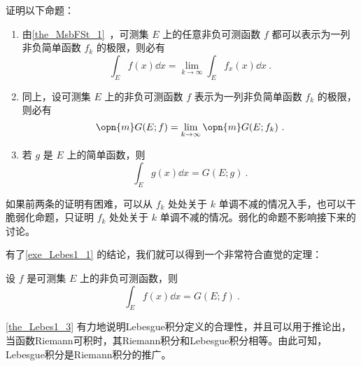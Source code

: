 \begin{exercise}{}\label{exe_Lebes1_1}
证明以下命题：

\begin{enumerate}
\item 由\autoref{the_MsbFSt_1}~，可测集 $E$ 上的任意非负可测函数 $f$ 都可以表示为一列非负简单函数 $f_k$ 的极限，则必有
\begin{equation}
\int_E f(x) \dd x = \lim\limits_{k\to\infty} \int_{E} f_x(x) \dd x~.
\end{equation}
\item 同上，设可测集 $E$ 上的非负可测函数 $f$ 表示为一列非负简单函数 $f_k$ 的极限，则必有
\begin{equation}
\opn{m}G(E; f)=\lim\limits_{k\to \infty} \opn{m}G(E; f_k)~.
\end{equation}
\item 若 $g$ 是 $E$ 上的简单函数，则
\begin{equation}
\int_E g(x) \dd x = G(E; g)~.
\end{equation}
\end{enumerate}

如果前两条的证明有困难，可以从 $f_k$ 处处关于 $k$ 单调不减的情况入手，也可以干脆弱化命题，只证明 $f_k$ 处处关于 $k$ 单调不减的情况。弱化的命题不影响接下来的讨论。
\end{exercise}

有了\autoref{exe_Lebes1_1} 的结论，我们就可以得到一个非常符合直觉的定理：

\begin{theorem}{}\label{the_Lebes1_3}
设 $f$ 是可测集 $E$ 上的非负可测函数，则
\begin{equation}
\int_E f(x) \dd x = G(E; f)~.
\end{equation}
\end{theorem}

\autoref{the_Lebes1_3} 有力地说明Lebesgue积分定义的合理性，并且可以用于推论出，当函数Riemann可积时，其Riemann积分和Lebesgue积分相等。由此可知，Lebesgue积分是Riemann积分的推广。













